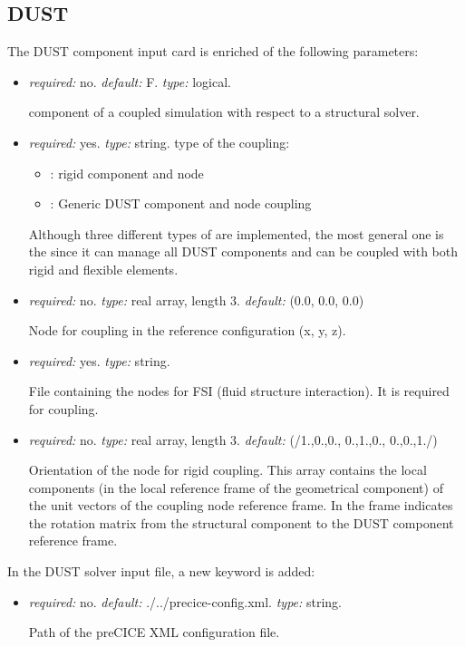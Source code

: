 \subsection{DUST}
\label{subsec:DUSTpreCICE}
The DUST component input card is enriched of the following parameters:
\begin{itemize}
    \item {} \textit{required:} no. \textit{default:} F. \textit{type:} logical.
    
    component of a coupled simulation with respect to a structural solver.
    
    \item {} \textit{required:} yes. \textit{type:} string. 
    type of the coupling:
    \begin{itemize}
        \item {}: rigid component and node 
        \item {}: Generic DUST component and node coupling
    \end{itemize}
    Although three different types of are implemented, the most general one 
    is the  since it can manage all DUST components and can be coupled with both rigid and flexible elements.  

  \item {} \textit{required:} no. \textit{type:} 
  real array, length 3. \textit{default:} (0.0, 0.0, 0.0)

    Node for  coupling in the reference configuration (x, y, z).

  \item {} \textit{required:} yes. \textit{type:} string. 

  File containing the nodes for FSI (fluid structure interaction). 
  It is required for  coupling. 

  \item {} \textit{required:} no. 
  \textit{type:} real array, length 3. \textit{default:} (/1.,0.,0., 0.,1.,0., 0.,0.,1./)

  Orientation of the node for rigid coupling. This array contains the local 
  components (in the local reference frame of the geometrical component) 
  of the unit vectors of the coupling node reference frame. In the  
  frame indicates the rotation matrix from the structural component to the 
  DUST component reference frame. 

\end{itemize}
In the DUST solver input file, a new keyword is added:
\begin{itemize}
    \item {} \textit{required:} no. \textit{default:} ./../precice-config.xml. \textit{type:} string.
    
    Path of the preCICE XML configuration file.
\end{itemize}
